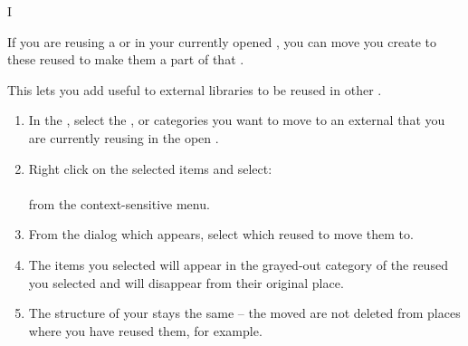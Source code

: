 I

If you are reusing a \gdproject{} or \gdprojects{} in your currently opened \gdproject{} , you can move \gdcases{} you create to these reused \gdprojects{} to make them a part of that \gdproject{}. 

This lets you add useful \gdcases{} to external libraries to be reused in other \gdprojects{}. 


\begin{enumerate}
\item In the \gdtestcasebrowser{}, select the \gdcase{}, \gdcases{} or categories you want to move to an external \gdproject{} that you are currently reusing in the open \gdproject{}. 
\item Right click on the selected items and select:\\
\\
from the context-sensitive menu. 
\item From the dialog which appears, select which reused \gdproject{} to move them to. 
\item The items you selected will appear in the grayed-out category of the reused \gdproject{} you selected and will disappear from their original place. 
\item The structure of your \gdproject{} stays the same -- the moved \gdcases{} are not deleted from places where you have reused them, for example. 
\end{enumerate}
